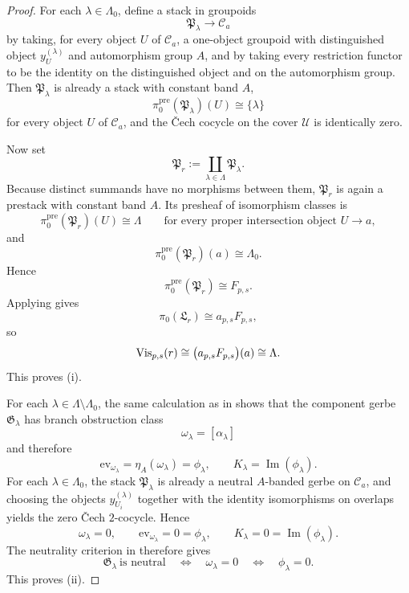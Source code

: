 \begin{proof}
For each $\lambda\in\Lambda_0$, define a stack in groupoids
\[
\mathfrak P_\lambda\to \mathcal C_a
\]
by taking, for every object $U$ of $\mathcal C_a$, a one-object groupoid with distinguished object $y_U^{(\lambda)}$ and automorphism group $A$, and by taking every restriction functor to be the identity on the distinguished object and on the automorphism group. Then $\mathfrak P_\lambda$ is already a stack with constant band $A$,
\[
\pi_0^{\mathrm{pre}}(\mathfrak P_\lambda)(U)\cong\{\lambda\}
\]
for every object $U$ of $\mathcal C_a$, and the \v{C}ech cocycle on the cover $\mathcal U$ is identically zero.

Now set
\[
\mathfrak P_r:=\coprod_{\lambda\in\Lambda}\mathfrak P_\lambda.
\]
Because distinct summands have no morphisms between them, $\mathfrak P_r$ is again a prestack with constant band $A$. Its presheaf of isomorphism classes is
\[
\pi_0^{\mathrm{pre}}(\mathfrak P_r)(U)\cong \Lambda
\qquad
\text{for every proper intersection object }U\to a,
\]
and
\[
\pi_0^{\mathrm{pre}}(\mathfrak P_r)(a)\cong \Lambda_0.
\]
Hence
\[
\pi_0^{\mathrm{pre}}(\mathfrak P_r)\cong F_{p,s}.
\]
Applying  gives
\[
\pi_0(\mathfrak L_r)\cong a_{p,s}F_{p,s},
\]
so
\[
\mathrm{Vis}_{p,s}(r)\cong \bigl(a_{p,s}F_{p,s}\bigr)(a)\cong \Lambda.
\]
This proves \textup{(i)}.

For each $\lambda\in\Lambda\setminus\Lambda_0$, the same calculation as in  shows that the component gerbe $\mathfrak G_\lambda$ has branch obstruction class
\[
\omega_\lambda=[\alpha_\lambda]
\]
and therefore
\[
\mathrm{ev}_{\omega_\lambda}=\eta_A(\omega_\lambda)=\phi_\lambda,
\qquad
K_\lambda=\operatorname{Im}(\phi_\lambda).
\]
For each $\lambda\in\Lambda_0$, the stack $\mathfrak P_\lambda$ is already a neutral $A$-banded gerbe on $\mathcal C_a$, and choosing the objects $y_{U_i}^{(\lambda)}$ together with the identity isomorphisms on overlaps yields the zero \v{C}ech $2$-cocycle. Hence
\[
\omega_\lambda=0,
\qquad
\mathrm{ev}_{\omega_\lambda}=0=\phi_\lambda,
\qquad
K_\lambda=0=\operatorname{Im}(\phi_\lambda).
\]
The neutrality criterion in  therefore gives
\[
\mathfrak G_\lambda\ \text{is neutral}
\quad\Longleftrightarrow\quad
\omega_\lambda=0
\quad\Longleftrightarrow\quad
\phi_\lambda=0.
\]
This proves \textup{(ii)}.


\end{proof}

